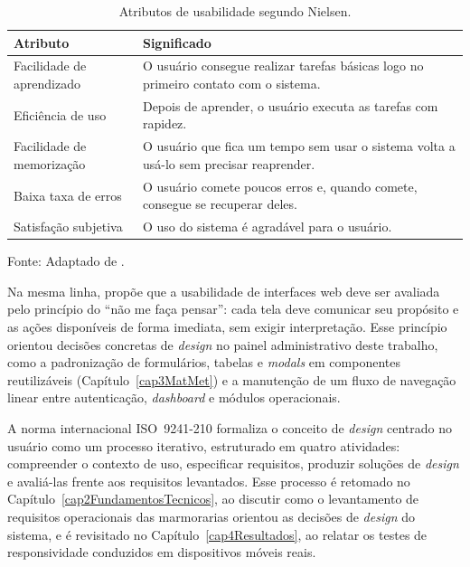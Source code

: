 \begin{table}[H]
\centering
\caption{Atributos de usabilidade segundo Nielsen.}
\label{tab:nielsen}
\begin{tabular}{p{4.2cm}p{9.8cm}}
\hline
\textbf{Atributo} & \textbf{Significado} \\
\hline
Facilidade de aprendizado & O usuário consegue realizar tarefas básicas logo no primeiro contato com o sistema. \\
Eficiência de uso & Depois de aprender, o usuário executa as tarefas com rapidez. \\
Facilidade de memorização & O usuário que fica um tempo sem usar o sistema volta a usá-lo sem precisar reaprender. \\
Baixa taxa de erros & O usuário comete poucos erros e, quando comete, consegue se recuperar deles. \\
Satisfação subjetiva & O uso do sistema é agradável para o usuário. \\
\hline
\end{tabular}
\begin{minipage}{0.95\textwidth}
  \vspace{0.3em}
  {\small Fonte: Adaptado de .}
\end{minipage}
\end{table}

Na mesma linha,  propõe que a usabilidade de interfaces web deve ser avaliada pelo princípio do ``não me faça pensar'': cada tela deve comunicar seu propósito e as ações disponíveis de forma imediata, sem exigir interpretação. Esse princípio orientou decisões concretas de \textit{design} no painel administrativo deste trabalho, como a padronização de formulários, tabelas e \textit{modals} em componentes reutilizáveis (Capítulo~\ref{cap3MatMet}) e a manutenção de um fluxo de navegação linear entre autenticação, \textit{dashboard} e módulos operacionais.

A norma internacional ISO~9241-210 \cite{iso9241210} formaliza o conceito de \textit{design} centrado no usuário como um processo iterativo, estruturado em quatro atividades: compreender o contexto de uso, especificar requisitos, produzir soluções de \textit{design} e avaliá-las frente aos requisitos levantados. Esse processo é retomado no Capítulo~\ref{cap2FundamentosTecnicos}, ao discutir como o levantamento de requisitos operacionais das marmorarias orientou as decisões de \textit{design} do sistema, e é revisitado no Capítulo~\ref{cap4Resultados}, ao relatar os testes de responsividade conduzidos em dispositivos móveis reais.

